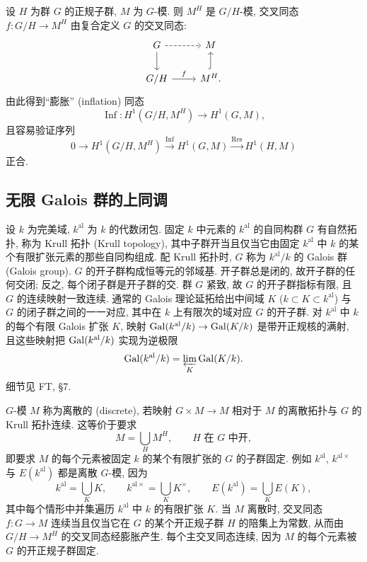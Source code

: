 \begin{remark} \label{thm:4.1.7} 
设 $H$ 为群 $G$ 的正规子群, $M$ 为 $G$-模. 则 $M^H$ 是 $G/H$-模, 交叉同态 $f\colon G/H\to M^H$ 由复合定义 $G$ 的交叉同态:
\[\begin{tikzcd}
	G & M \\
	{G/H} & {M^H.}
	\arrow[dashed, from=1-1, to=1-2]
	\arrow[from=1-1, to=2-1]
	\arrow["f", from=2-1, to=2-2]
	\arrow[hook, from=2-2, to=1-2]
\end{tikzcd}\]
由此得到``膨胀'' (inflation) 同态
\[
\operatorname{Inf}\colon H^1(G/H, M^H)\to H^1(G, M),
\]
且容易验证序列
\[
0\to H^1(G/H, M^H)\xrightarrow{\operatorname{Inf}}H^1(G, M)\xrightarrow{\operatorname{Res}}H^1(H, M)
\]
正合.
\end{remark}

\subsection*{无限 Galois 群的上同调}

设 $k$ 为完美域, $k^{\mathrm{al}}$ 为 $k$ 的代数闭包. 固定 $k$ 中元素的 $k^{\mathrm{al}}$ 的自同构群 $G$ 有自然拓扑, 称为 Krull 拓扑 (Krull topology), 其中子群开当且仅当它由固定 $k^{\mathrm{al}}$ 中 $k$ 的某个有限扩张元素的那些自同构组成. 配 Krull 拓扑时, $G$ 称为 $k^{\mathrm{al}}/k$ 的 Galois 群 (Galois group). $G$ 的开子群构成恒等元的邻域基. 开子群总是闭的, 故开子群的任何交闭; 反之, 每个闭子群是开子群的交. 群 $G$ 紧致, 故 $G$ 的开子群指标有限, 且 $G$ 的连续映射一致连续. 通常的 Galois 理论延拓给出中间域 $K$ ($k\subset K\subset k^{\mathrm{al}}$) 与 $G$ 的闭子群之间的一一对应, 其中在 $k$ 上有限次的域对应 $G$ 的开子群. 对 $k^{\mathrm{al}}$ 中 $k$ 的每个有限 Galois 扩张 $K$, 映射 $\operatorname{Gal}(k^{\mathrm{al}}/k)\to\operatorname{Gal}(K/k)$ 是带开正规核的满射, 且这些映射把 $\operatorname{Gal}(k^{\mathrm{al}}/k)$ 实现为逆极限
\[
\operatorname{Gal}(k^{\mathrm{al}}/k) = \varprojlim_K\operatorname{Gal}(K/k).
\]
细节见 FT, \S7.

$G$-模 $M$ 称为离散的 (discrete), 若映射 $G\times M\to M$ 相对于 $M$ 的离散拓扑与 $G$ 的 Krull 拓扑连续. 这等价于要求
\[
M = \bigcup_H M^H, \qquad H \text{ 在 } G \text{ 中开},
\]
即要求 $M$ 的每个元素被固定 $k$ 的某个有限扩张的 $G$ 的子群固定. 例如 $k^{\mathrm{al}}$, $k^{\mathrm{al}\times}$ 与 $E(k^{\mathrm{al}})$ 都是离散 $G$-模, 因为
\[
k^{\mathrm{al}} = \bigcup_K K, \qquad k^{\mathrm{al}\times} = \bigcup_K K^{\times}, \qquad E(k^{\mathrm{al}}) = \bigcup_K E(K),
\]
其中每个情形中并集遍历 $k^{\mathrm{al}}$ 中 $k$ 的有限扩张 $K$. 当 $M$ 离散时, 交叉同态 $f\colon G\to M$ 连续当且仅当它在 $G$ 的某个开正规子群 $H$ 的陪集上为常数, 从而由 $G/H\to M^H$ 的交叉同态经膨胀产生. 每个主交叉同态连续, 因为 $M$ 的每个元素被 $G$ 的开正规子群固定.

